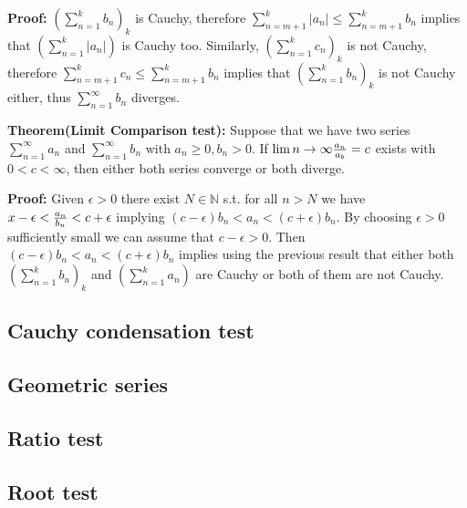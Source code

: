 \documentclass{article}
\begin{document}
\textbf{Proof:} $(\sum_{n=1}^{k}{b_n})_k$ is Cauchy, therefore $\sum_{n=m+1}^{k}{|a_n|}\leq \sum_{n=m+1}^{k}{b_n}$ implies that $(\sum_{n=1}^{k}{|a_n|})$ is Cauchy too. 
Similarly, $(\sum_{n=1}^{k}{c_n})_k$ is not Cauchy, therefore $\sum_{n=m+1}^{k}{c_n}\leq \sum_{n=m+1}^{k}{b_n}$ implies that $(\sum_{n=1}^{k}{b_n})_k$ is not Cauchy either, thus $\sum_{n=1}^{\infty}{b_n}$ diverges.

\textbf{Theorem(Limit Comparison test):} Suppose that we have two series $\sum_{n=1}^{\infty}{a_n}$ and $\sum_{n=1}^{\infty}{b_n}$ with $a_n\geq 0, b_n > 0$. If $\lim{n\to \infty}{a_n\over a_b}=c$ exists with $0<c<\infty$, then either both series converge or both diverge.

\textbf{Proof:} Given $\epsilon > 0$ there exist $N\in \mathbb{N}$ s.t. for all $n>N$ we have $x-\epsilon <{a_n\over b_n} < c + \epsilon$ implying $(c-\epsilon)b_n<a_n<(c+\epsilon)b_n$. By choosing $\epsilon>0$ sufficiently small we can assume that $c-\epsilon >0$. Then $(c-\epsilon)b_n<a_n<(c+\epsilon)b_n$ implies using the previous result that either both $(\sum_{n=1}^{k}{b_n})_k$ and $(\sum_{n=1}^{k}{a_n})$ are Cauchy or both of them are not Cauchy.

\subsection{Cauchy condensation test}

\subsection{Geometric series}
\subsection{Ratio test}
\subsection{Root test}
\end{document}
